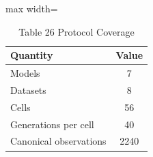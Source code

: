 \begin{table}[tbp]
\centering
\footnotesize
\caption{Table 26 Protocol Coverage}
\label{tab:table_26_protocol_coverage}
\begin{adjustbox}{max width=\linewidth}
\begin{tabular}{lc}
\toprule
Quantity & Value \\
\midrule
Models & 7 \\
Datasets & 8 \\
Cells & 56 \\
Generations per cell & 40 \\
Canonical observations & 2240 \\
\bottomrule
\end{tabular}
\end{adjustbox}
\end{table}
